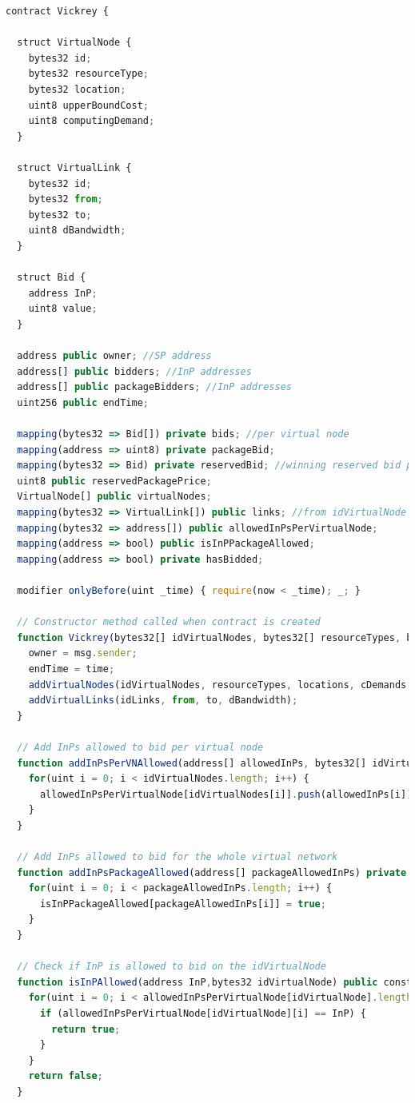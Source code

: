 \begin{lstlisting}[language=JavaScript]
contract Vickrey {

  struct VirtualNode {
    bytes32 id;
    bytes32 resourceType;
    bytes32 location;
    uint8 upperBoundCost;
    uint8 computingDemand;
  }

  struct VirtualLink {
    bytes32 id;
    bytes32 from;
    bytes32 to;
    uint8 dBandwidth;
  }
  
  struct Bid {
    address InP;
    uint8 value;
  }
  
  address public owner; //SP address
  address[] public bidders; //InP addresses
  address[] public packageBidders; //InP addresses
  uint256 public endTime;
  
  mapping(bytes32 => Bid[]) private bids; //per virtual node
  mapping(address => uint8) private packageBid;
  mapping(bytes32 => Bid) private reservedBid; //winning reserved bid per virtual node
  uint8 public reservedPackagePrice;
  VirtualNode[] public virtualNodes;
  mapping(bytes32 => VirtualLink[]) public links; //from idVirtualNode
  mapping(bytes32 => address[]) public allowedInPsPerVirtualNode;
  mapping(address => bool) public isInPPackageAllowed;
  mapping(address => bool) private hasBidded;
    
  modifier onlyBefore(uint _time) { require(now < _time); _; }

  // Constructor method called when contract is created
  function Vickrey(bytes32[] idVirtualNodes, bytes32[] resourceTypes, bytes32[] locations, uint8[] upperBoundCosts, uint8[] cDemands, bytes32[] idLinks, bytes32[] from, bytes32[] to, uint8[] dBandwidth, uint256 time) public {
    owner = msg.sender;
    endTime = time;
    addVirtualNodes(idVirtualNodes, resourceTypes, locations, cDemands, upperBoundCosts);
    addVirtualLinks(idLinks, from, to, dBandwidth);
  }

  // Add InPs allowed to bid per virtual node
  function addInPsPerVNAllowed(address[] allowedInPs, bytes32[] idVirtualNodes) private {
    for(uint i = 0; i < idVirtualNodes.length; i++) {
      allowedInPsPerVirtualNode[idVirtualNodes[i]].push(allowedInPs[i]);
    }
  }

  // Add InPs allowed to bid for the whole virtual network
  function addInPsPackageAllowed(address[] packageAllowedInPs) private {
    for(uint i = 0; i < packageAllowedInPs.length; i++) {
      isInPPackageAllowed[packageAllowedInPs[i]] = true;
    }
  }
  
  // Check if InP is allowed to bid on the idVirtualNode
  function isInPAllowed(address InP,bytes32 idVirtualNode) public constant returns (bool){
    for(uint i = 0; i < allowedInPsPerVirtualNode[idVirtualNode].length; i++) {
      if (allowedInPsPerVirtualNode[idVirtualNode][i] == InP) {
        return true;
      }
    }
    return false;
  }


\end{lstlisting}
